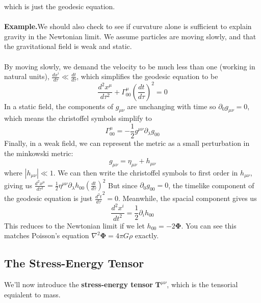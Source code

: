 \documentclass[11pt]{article}
\begin{document}
\noindent which is just the geodesic equation. 
\\
\\
\noindent \textbf{Example.}We should also check to see if curvature alone is sufficient to explain gravity in the Newtonian limit. We assume particles are moving slowly, and that
the gravitational field is weak and static. 
\\
\\
By moving slowly, we demand the velocity to be much less than one (working in natural units), \(\frac{dx^i}{d\tau} \ll \frac{dt}{d\tau}\), which simplifies the geodesic equation to be
\[
    \frac{d^2 x^\mu}{d\tau^2} + \Gamma^\mu_{0 0}\left(\frac{dt}{d\tau}\right)^2 = 0
\]
\noindent In a static field, the components of \(g_{\mu\nu}\) are unchanging with time so \(\partial_0 g_{\mu\nu} = 0\), which means the christoffel symbols simplify to
\[
    \Gamma^\mu_{0 0} = -\frac{1}{2}g^{\mu\nu}\partial_\lambda g_{0 0}
\]
Finally, in a weak field, we can represent the metric as a small perturbation in the minkowski metric:
\[
    g_{\mu\nu} = \eta_{\mu\nu} + h_{\mu\nu}
\]
where \(|h_{\mu\nu}| \ll 1\). We can then write the christoffel symbols to first order in \(h_{\mu\nu}\), giving us \(\frac{d^2 x^\mu}{d\tau^2} = \frac{1}{2}\eta^{\mu\nu}\partial_{\lambda}h_{0 0}\left(\frac{dt}{d\tau}\right)^2\)
But since \(\partial_0 g_{0 0} = 0\), the timelike component of the geodesic equation is just \(\frac{d^2 t}{d\tau}^2 = 0\). Meanwhile, the spacial component gives us 
\[
    \frac{d^2 x^i}{dt^2} = \frac{1}{2}\partial_i h_{0 0}
\]
This reduces to the Newtonian limit if we let \(h_{0 0} = -2\mathbf{\Phi}\). You can see this matches Poisson's equation \(\nabla^2 \mathbf{\Phi} = 4\pi G \rho\) exactly. 


\subsection{The Stress-Energy Tensor}

\noindent We'll now introduce the \textbf{stress-energy tensor} $\mathbf{T}^{\mu\nu}$, which is the tensorial equialent to mass.  
\end{document}
